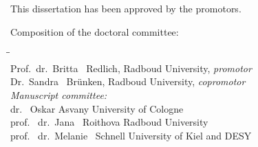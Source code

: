 \begin{titlepage}
    \noindent This dissertation has been approved by the promotors.

    \bigskip
    \noindent Composition of the doctoral committee:
    
    \begin{tabbing}
        \hspace{\tabcolsep}\=\hspace{0.33\textwidth}\=\hspace{0.66\textwidth}                   \\[-3\medskipamount]
        \> Prof.\ dr.\ Britta \ Redlich,    \> Radboud University, \textit{promotor}      \\
        \> Dr.\ Sandra \ Br\"{u}nken,        \> Radboud University, \textit{copromotor}    \\[\medskipamount]
        \>\textit{Manuscript committee:}  \\[\smallskipamount]
        \> dr. \ Oskar Asvany            \> University of Cologne \\
        \> prof. \ dr.\ Jana \ Roithova            \> Radboud University \\
        \> prof. \ dr.\ Melanie \ Schnell   \> University of Kiel and DESY \\[\medskipamount]
    \end{tabbing}

\end{titlepage}
\cleardoublepage
